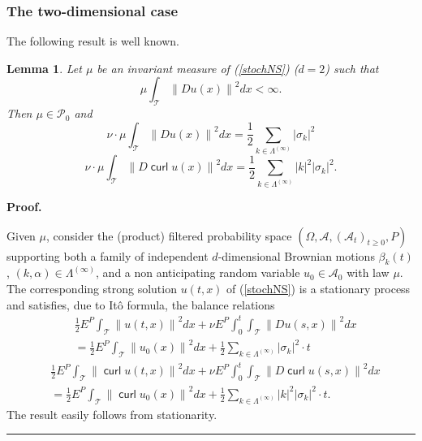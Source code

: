 \documentclass[11pt]{preprint}
\DeclareMathOperator{\Curl}{\mathsf{curl}}
\newtheorem{lemma}[theorem]{Lemma}
\newenvironment{proof}[1][Proof]{\textbf{#1.} }{\ \rule{0.5em}{0.5em}}
\begin{document}
\subsubsection{The two-dimensional case}

The following result is well known.

\begin{lemma}
Let $\mu$ be an invariant measure of (\ref{stochNS}) ($d=2$) such that
\[
\mu\int_{\mathcal{T}}\left\|  Du\left(  x\right)  \right\|  ^{2}dx<\infty.
\]
Then $\mu\in\mathcal{P}_{0}$ and
\[
\nu\cdot\mu\int_{\mathcal{T}}\left\|  Du\left(  x\right)  \right\|
^{2}dx=\frac{1}{2}\sum_{k\in\Lambda^{\left(
\infty\right)  }}\left|  \sigma_k\right|  ^{2}%
\]%
\[
\nu\cdot\mu\int_{\mathcal{T}}\left\|  D\Curl u\left(  x\right)
\right\|  ^{2}dx=\frac{1}{2}\sum_{k\in\Lambda^{\left(
\infty\right)  }}\left|  k\right|  ^{2}\left|  \sigma_k\right|  ^{2}.
\]
\end{lemma}

\begin{proof}

Given $\mu$, consider the (product) filtered probability space $(
\Omega,\mathcal{A},(  \mathcal{A}_{t})  _{t\geq0},P)  $
supporting both a family of independent $d$-dimensional Brownian motions $\beta_{k}\left(  t\right)  $, $\left(  k,\alpha\right)  \in\Lambda^{\left(
\infty\right)  }$, and a non anticipating random variable $u_{0} \in \mathcal{A}_{0}$ with law
$\mu$. The corresponding strong solution $u(t,x)$ of (\ref{stochNS}) is a
stationary process and satisfies, due to It\^{o} formula, the balance
relations
\begin{align*}
& \frac{1}{2}E^{P}\int_{\mathcal{T}}\left\|  u\left(  t,x\right)  \right\|
^{2}dx+\nu E^{P}\int_{0}^{t}\int_{\mathcal{T}}\left\|  Du\left(  s,x\right)
\right\|  ^{2}dx\\
& =\frac{1}{2}E^{P}\int_{\mathcal{T}}\left\|  u_{0}\left(  x\right)  \right\|
^{2}dx+\frac{1}{2}\sum_{k\in\Lambda^{(
\infty)}}\left|  \sigma_k\right|  ^{2}\cdot t
\end{align*}%
\begin{align*}
& \frac{1}{2}E^{P}\int_{\mathcal{T}}\left\|  \Curl u\left(  t,x\right)
\right\|  ^{2}dx+\nu E^{P}\int_{0}^{t}\int_{\mathcal{T}}\left\|
D\Curl u\left(  s,x\right)  \right\|  ^{2}dx\\
& =\frac{1}{2}E^{P}\int_{\mathcal{T}}\left\|  \Curl u_{0}\left(
x\right)  \right\|  ^{2}dx+\frac{1}{2}\sum_{k\in\Lambda^{(\infty)}}
\left|  k\right|  ^{2}\left|
\sigma_k\right|  ^{2}\cdot t.
\end{align*}
The result easily follows from stationarity.
\end{proof}
\end{document}
